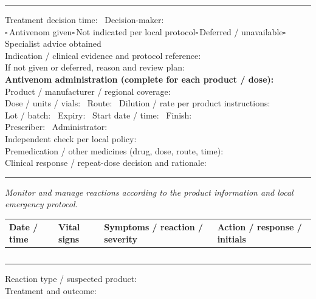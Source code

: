 \documentclass[10pt,a4paper]{article}
\newcommand{\boxx}{\ensuremath{\square}}
\newcommand{\checkitem}[1]{\boxx\,#1\quad}
\newcommand{\linefield}[2]{#1\ \underline{\hspace{#2}}}
\newcommand{\sectionbar}[1]{\vspace{3pt}{\large\bfseries #1}\par\vspace{1pt}\hrule\vspace{3pt}}
\begin{document}
\newpage
\sectionbar{7. Treatment and antivenom decision}
\linefield{Treatment decision time:}{3.8cm} \linefield{Decision-maker:}{4.0cm}\\
\checkitem{Antivenom given}\checkitem{Not indicated per local protocol}\checkitem{Deferred / unavailable}\checkitem{Specialist advice obtained}\\
\linefield{Indication / clinical evidence and protocol reference:}{4.5cm}\\
\linefield{If not given or deferred, reason and review plan:}{5.0cm}\\
\textbf{Antivenom administration (complete for each product / dose):}\\
\linefield{Product / manufacturer / regional coverage:}{5.0cm}\\
\linefield{Dose / units / vials:}{3.5cm} \linefield{Route:}{2.0cm} \linefield{Dilution / rate per product instructions:}{2.2cm}\\
\linefield{Lot / batch:}{3.5cm} \linefield{Expiry:}{2.5cm} \linefield{Start date / time:}{3.0cm} \linefield{Finish:}{1.8cm}\\
\linefield{Prescriber:}{3.8cm} \linefield{Administrator:}{3.8cm}\\
\linefield{Independent check per local policy:}{7.0cm}\\
\linefield{Premedication / other medicines (drug, dose, route, time):}{4.2cm}\\
\linefield{Clinical response / repeat-dose decision and rationale:}{4.6cm}

\sectionbar{8. Antivenom monitoring and reaction record}
\textit{Monitor and manage reactions according to the product information and local emergency protocol.}\\
\begin{tabularx}{\linewidth}{|p{1.6cm}|p{2.1cm}|X|p{2.8cm}|}
\hline
Date / time & Vital signs & Symptoms / reaction / severity & Action / response / initials \\
\hline
\rule{0pt}{8mm} & & & \\\hline
\rule{0pt}{8mm} & & & \\\hline
\rule{0pt}{8mm} & & & \\\hline
\rule{0pt}{8mm} & & & \\\hline
\rule{0pt}{8mm} & & & \\\hline
\end{tabularx}
\linefield{Reaction type / suspected product:}{5.0cm}\\
\linefield{Treatment and outcome:}{6.0cm}
\end{document}
